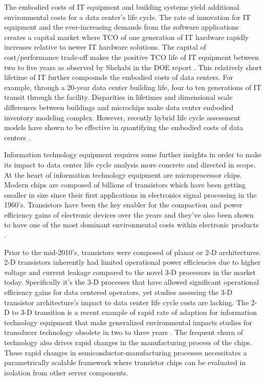         The embodied costs of IT equipment and building systems yield additional environmental costs for a data center's life cycle. The rate of innovation for IT equipment and the ever-increasing demands from the software applications creates a capital market where TCO of one generation of IT hardware rapidly increases relative to newer IT hardware solutions. The capital of cost/performance trade-off makes the positive TCO life of IT equipment between two to five years as observed by Shehabi in the DOE report \cite{Shehabi16}. This relatively short lifetime of IT further compounds the embodied costs of data centers. For example, through a 20-year data center building life, four to ten generations of IT transit through the facility. Disparities in lifetimes and dimensional scale differences between buildings and microchips make data center embodied inventory modeling complex. However, recently hybrid life cycle assessment models have shown to be effective in quantifying the embodied costs of data centers \cite{shah11, whitehead15}. 

        Information technology equipment requires some further insights in order to make its impact to data center life cycle analysis more concrete and directed in scope. At the heart of information technology equipment are microprocessor chips. Modern chips are composed of billions of transistors which have been getting smaller in size since their first applications in electronics signal processing in the 1960's. Transistors have been the key enabler for the compaction and power efficiency gains of electronic devices over the years and they've also been shown to have one of the most dominant environmental costs within electronic products \cite{boyd09, alcaraz18}.

        Prior to the mid-2010's, transistors were composed of planar or 2-D architectures. 2-D transistors inherently had limited operational power efficiencies due to higher voltage and current leakage compared to the novel 3-D processors in the market today. Specifically it's the 3-D processes that have allowed significant operational efficiency gains for data centered operators, yet studies assessing the 3-D transistor architecture's impact to data center life cycle costs are lacking. The 2-D to 3-D transition is a recent example of rapid rate of adaption for information technology equipment that make generalized environmental impacts studies for transducer technology obsolete in two to three years \cite{murphy03}. The frequent churn of technology also drives rapid changes in the manufacturing process of the chips. These rapid changes in semiconductor-manufacturing processes necessitates a parametrically scalable framework where transistor chips can be evaluated in isolation from other server components.  

